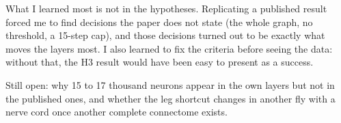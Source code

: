 \documentclass[11pt,letterpaper]{article}
\begin{document}
What I learned most is not in the hypotheses. Replicating a published result forced me to find decisions the paper does not state (the whole graph, no threshold, a 15-step cap), and those decisions turned out to be exactly what moves the layers most. I also learned to fix the criteria before seeing the data: without that, the H3 result would have been easy to present as a success.

Still open: why 15 to 17 thousand neurons appear in the own layers but not in the published ones, and whether the leg shortcut changes in another fly with a nerve cord once another complete connectome exists.



\end{document}
